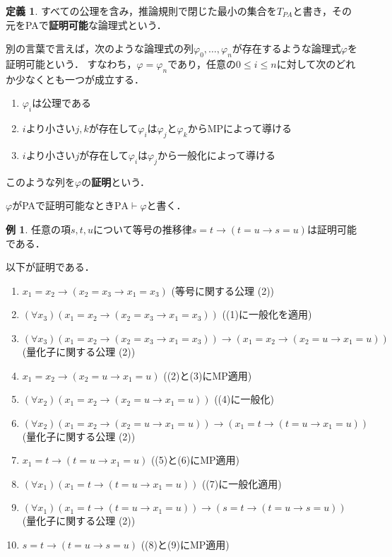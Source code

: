 \documentclass[uplatex]{jsarticle}
\theoremstyle{definition} %
\newtheorem{defi}[thm]{定義}
\newtheorem{exm}[thm]{例}
\begin{document}
\begin{defi}
すべての公理を含み，推論規則で閉じた最小の集合を$T_{PA}$と書き，その元をPAで{\bfseries 証明可能}な論理式という．

別の言葉で言えば，次のような論理式の列$\varphi_0, \dots, \varphi_n$が存在するような論理式$\varphi$を証明可能という．
すなわち，$\varphi = \varphi_n$であり，任意の$0 \le i \le n$に対して次のどれか少なくとも一つが成立する．
\begin{enumerate}
\item $\varphi_i$は公理である
\item $i$より小さい$j, k$が存在して$\varphi_i$は$\varphi_j$と$\varphi_k$からMPによって導ける
\item $i$より小さい$j$が存在して$\varphi_i$は$\varphi_j$から一般化によって導ける
\end{enumerate}
このような列を$\varphi$の{\bfseries 証明}という．

$\varphi$がPAで証明可能なとき$\mathrm{PA} \vdash \varphi$と書く．
\end{defi}
\begin{exm}\label{推移律}
任意の項$s, t, u$について等号の推移律$s = t \to (t=u \to s=u)$は証明可能である．

以下が証明である．
\begin{enumerate}
\item $x_1 = x_2 \to (x_2 = x_3 \to x_1 = x_3)$ (等号に関する公理 (2))
\item $(\forall x_3) (x_1 = x_2 \to (x_2 = x_3 \to x_1 = x_3))$ ((1)に一般化を適用)
\item $(\forall x_3) (x_1 = x_2 \to (x_2 = x_3 \to x_1 = x_3)) \to (x_1 = x_2 \to (x_2 = u \to x_1 = u))$ (量化子に関する公理 (2))
\item $x_1 = x_2 \to (x_2 = u \to x_1 = u)$ ((2)と(3)にMP適用)
\item $(\forall x_2) (x_1 = x_2 \to (x_2 = u \to x_1 = u))$ ((4)に一般化)
\item $(\forall x_2) (x_1 = x_2 \to (x_2 = u \to x_1 = u)) \to (x_1 = t \to (t = u \to x_1 = u))$ (量化子に関する公理 (2))
\item $x_1 = t \to (t = u \to x_1 = u)$ ((5)と(6)にMP適用)
\item $(\forall x_1) (x_1 = t \to (t = u \to x_1 = u))$ ((7)に一般化適用)
\item $(\forall x_1) (x_1 = t \to (t = u \to x_1 = u))　\to (s = t \to (t = u \to s = u))$ (量化子に関する公理 (2))
\item $s = t \to (t = u \to s = u)$ ((8)と(9)にMP適用)
\end{enumerate}
\end{exm}
\end{document}
